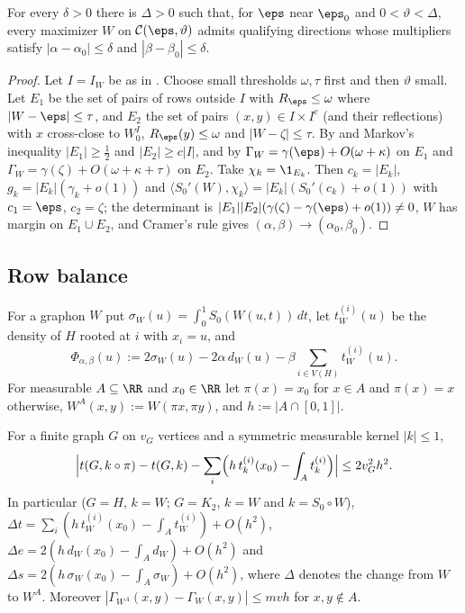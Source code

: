 \begin{proposition}[Multipliers]\label{kb:prop:multipliers}
For every $\delta>0$ there is $\Delta>0$ such that, for $\eps$ near $\eps_0$ and
$0<\vartheta<\Delta$, every maximizer $W$ on $\mathcal C(\eps,\vartheta)$ admits qualifying
directions whose multipliers satisfy $|\alpha-\alpha_0|\le\delta$ and $|\beta-\beta_0|\le\delta$.
\end{proposition}

\begin{proof}
Let $I=I_W$ be as in .  Choose small thresholds $\omega,\tau$ first and
then $\vartheta$ small.  Let $E_1$ be the set of pairs of rows outside $I$ with $R_\eps\le\omega$
where $|W-\eps|\le\tau$, and $E_2$ the set of pairs $(x,y)\in I\times I^c$ (and their
reflections) with $x$ cross-close to $W_0^I$, $R_\eps(y)\le\omega$ and $|W-\zeta|\le\tau$.  By
 and Markov's inequality $|E_1|\ge\frac12$ and $|E_2|\ge c|I|$, and by
 $\Gamma_W=\gamma(\eps)+O(\omega+\kappa)$ on $E_1$ and
$\Gamma_W=\gamma(\zeta)+O(\omega+\kappa+\tau)$ on $E_2$.  Take $\chi_k=\1_{E_k}$.  Then
$c_k=|E_k|$, $g_k=|E_k|(\gamma_k+o(1))$ and $\langle S_0'(W),\chi_k\rangle=|E_k|(S_0'(c_k)+o(1))$
with $c_1=\eps$, $c_2=\zeta$; the determinant is $|E_1||E_2|(\gamma(\zeta)-\gamma(\eps)+o(1))\ne0$,
$W$ has margin on $E_1\cup E_2$, and Cramer's rule gives $(\alpha,\beta)\to(\alpha_0,\beta_0)$.
\end{proof}

\subsection{Row balance}
\label{kb:sec:row}

For a graphon $W$ put $\sigma_W(u)=\int_0^1S_0(W(u,t))\,dt$, let $t^{(i)}_W(u)$ be the density of
$H$ rooted at $i$ with $x_i=u$, and
\[
  \Phi_{\alpha,\beta}(u):=2\sigma_W(u)-2\alpha\,d_W(u)-\beta\sum_{i\in V(H)}t^{(i)}_W(u).
\]
For measurable $A\subseteq\RR$ and $x_0\in\RR$ let $\pi(x)=x_0$ for $x\in A$ and $\pi(x)=x$
otherwise, $W^A(x,y):=W(\pi x,\pi y)$, and $h:=|A\cap[0,1]|$.

\begin{lemma}[Replacement]\label{kb:lem:replacement}
For a finite graph $G$ on $v_G$ vertices and a symmetric measurable kernel $|k|\le1$,
\[
  \Bigl|t(G,k\circ\pi)-t(G,k)-\sum_i\Bigl(h\,t^{(i)}_k(x_0)-\int_At^{(i)}_k\Bigr)\Bigr|
  \le2v_G^2h^2 .
\]
In particular ($G=H$, $k=W$; $G=K_2$, $k=W$ and $k=S_0\circ W$),
$\Delta t=\sum_i(h\,t^{(i)}_W(x_0)-\int_At^{(i)}_W)+O(h^2)$,
$\Delta e=2(h\,d_W(x_0)-\int_Ad_W)+O(h^2)$ and $\Delta s=2(h\,\sigma_W(x_0)-\int_A\sigma_W)+O(h^2)$,
where $\Delta$ denotes the change from $W$ to $W^A$.  Moreover
$|\Gamma_{W^A}(x,y)-\Gamma_W(x,y)|\le mvh$ for $x,y\notin A$.
\end{lemma}

